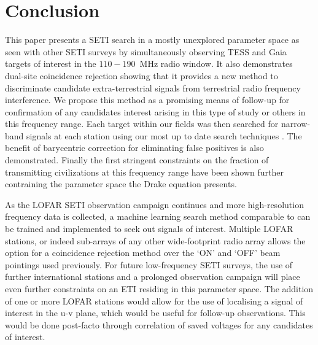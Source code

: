 \section{Conclusion}\label{sec:conclusion}

This paper presents a SETI search in a mostly unexplored parameter space as seen with other SETI surveys \citep{Gajjar_2021_BLGC1, Price:2018bv} by simultaneously observing TESS and Gaia targets of interest in the $110-190$~MHz radio window. It also demonstrates dual-site coincidence rejection showing that it provides a new method to discriminate candidate extra-terrestrial signals from terrestrial radio frequency interference. We propose this method as a promising means of follow-up for confirmation of any candidates interest arising in this type of study or others in this frequency range. Each target within our fields was then searched for narrow-band signals at each station using our most up to date search techniques \citep{Enriquez:2017}. The benefit of barycentric correction for eliminating false positives is also demonstrated. Finally the first stringent constraints on the fraction of transmitting civilizations at this frequency range have been shown further contraining the parameter space the Drake equation presents.   

As the LOFAR SETI observation campaign continues and more high-resolution frequency data is collected, a machine learning search method comparable to \cite{BLSETI_ML_2023} can be trained and implemented to seek out signals of interest. Multiple LOFAR stations, or indeed sub-arrays of any other wide-footprint radio array allows the option for a coincidence rejection method over the `ON' and `OFF' beam pointings used previously. For future low-frequency SETI surveys, the use of further international stations and a prolonged observation campaign will place even further constraints on an ETI residing in this parameter space. The addition of one or more LOFAR stations would allow for the use of localising a signal of interest in the u-v plane, which would be useful for follow-up observations. This would be done post-facto through correlation of saved voltages for any candidates of interest.
